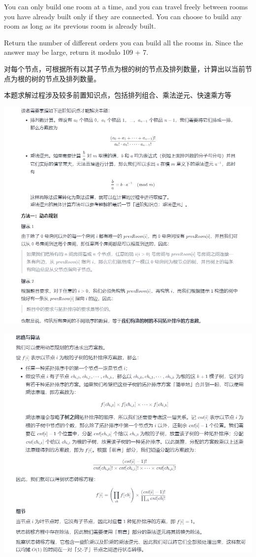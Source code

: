 \documentclass[9pt, b5paaper]{book}
\begin{document}
You can only build one room at a time, and you can travel freely between rooms you have already built only if they are connected. You can choose to build any room as long as its previous room is already built.

Return the number of different orders you can build all the rooms in. Since the answer may be large, return it modulo 109 + 7.

对每个节点，可根据所有以其子节点为根的树的节点及排列数量，计算出以当前节点为根的树的节点及排列数量。

本题求解过程涉及较多前置知识点，包括排列组合、乘法逆元、快速乘方等

\includegraphics[width=.9\linewidth]{./pic/ant1.png}

\includegraphics[width=.9\linewidth]{./pic/ant2.png}
\end{document}
